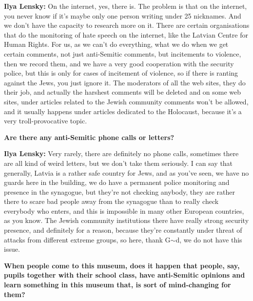 \textbf{Ilya Lensky:} On the internet, yes, there is. The problem is that on the internet, you never know if it's maybe only one person writing under 25 nicknames. And we don’t have the capacity to research more on it. There are certain organisations that do the monitoring of hate speech on the internet, like the Latvian Centre for Human Rights. For us, as we can’t do everything, what we do when we get certain comments, not just anti-Semitic comments, but incitements to violence, then we record them, and we have a very good cooperation with the security police, but this is only for cases of incitement of violence, so if there is ranting against the Jews, you just ignore it. The moderators of all the web sites, they do their job, and actually the harshest comments will be deleted and on some web sites, under articles related to the Jewish community comments won't be allowed, and it usually happens under articles dedicated to the Holocaust, because it's a very troll-provocative topic.

\textbf{Are there any anti-Semitic phone calls or letters?} 

\textbf{Ilya Lensky:} Very rarely, there are definitely no phone calls, sometimes there are all kind of weird letters, but we don’t take them seriously. I can say that generally, Latvia is a rather safe country for Jews, and as you’ve seen, we have no guards here in the building, we do have a permanent police monitoring and presence in the synagogue, but they’re not checking anybody, they are rather there to scare bad people away from the synagogue than to really check everybody who enters, and this is impossible in many other European countries, as you know. The Jewish community institutions there have really strong security presence, and definitely for a reason, because they’re constantly under threat of attacks from different extreme groups, so here, thank G$\sim$d, we do not have this issue.

\textbf{When people come to this museum, does it happen that people, say, pupils together with their school class, have anti-Semitic opinions and learn something in this museum that, is sort of mind-changing for them?} 

